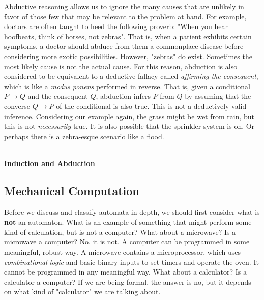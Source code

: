 Abductive reasoning allows us to ignore the many causes that are unlikely in favor of those few that may be relevant to the problem at hand. For example, doctors are often taught to heed the following proverb: "When you hear hoofbeats, think of horses, not zebras". That is, when a patient exhibits certain symptoms, a doctor should abduce from them a commonplace disease before considering more exotic possibilities. However, "zebras" do exist. Sometimes the most likely cause is not the actual cause. For this reason, abduction is also considered to be equivalent to a deductive fallacy called \textit{affirming the consequent}, which is like a \textit{modus ponens} performed in reverse. That is, given a conditional $P\rightarrow Q$ and the consequent $Q$, abduction infers $P$ from $Q$ by assuming that the converse $Q\rightarrow P$ of the conditional is also true. This is not a deductively valid inference. Considering our example again, the grass might be wet from rain, but this is not \textit{necessarily} true. It is also possible that the sprinkler system is on. Or perhaps there is a zebra-esque scenario like a flood. \\\\


\begin{tcolorbox}[breakable, enhanced, colback=textbook-blue, sharp corners]
	\vspace{2mm}
	\begin{center}
		\textbf{Induction and Abduction}
	\end{center}
	\vspace{1mm}
	
	\vspace{1mm}
\end{tcolorbox}
\vspace{7mm}


\subsection{Mechanical Computation}


Before we discuss and classify automata in depth, we should first consider what is \textbf{not} an automaton. What is an example of something that might perform some kind of calculation, but is not a computer? What about a microwave? Is a microwave a computer? No, it is not. A computer can be programmed in some meaningful, robust way. A microwave contains a microprocessor, which uses \textit{combinational logic} and basic binary inputs to set timers and operate the oven. It cannot be programmed in any meaningful way. What about a calculator? Is a calculator a computer? If we are being formal, the answer is no, but it depends on what kind of "calculator" we are talking about. \\

